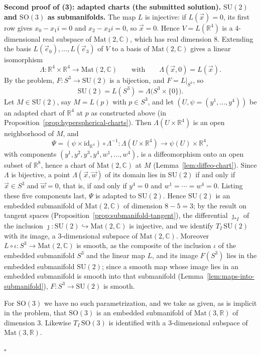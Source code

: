 \documentclass[11pt]{report}
\renewenvironment{proof}[1][Proof]{\noindent\textbf{#1.} }{\hfill$\square$\par\vspace{5pt}}
\begin{document}
\begin{proof}[Second proof of (3): adapted charts (the submitted solution)]
\textbf{$\mathrm{SU}(2)$ and $\mathrm{SO}(3)$ as submanifolds.} The map $L$ is injective: if $L(\vec x) = 0$, its first row gives $x_0 - x_1 i = 0$ and $x_2 - x_3 i = 0$, so $\vec x = 0$. Hence $V = L(\mathbb{R}^4)$ is a $4$-dimensional real subspace of $\mathrm{Mat}(2, \mathbb{C})$, which has real dimension $8$. Extending the basis $L(\vec e_0), \ldots, L(\vec e_3)$ of $V$ to a basis of $\mathrm{Mat}(2, \mathbb{C})$ gives a linear isomorphism
\[
\Lambda : \mathbb{R}^4 \times \mathbb{R}^4 \to \mathrm{Mat}(2, \mathbb{C}) \qquad \text{with} \qquad \Lambda(\vec x, 0) = L(\vec x).
\]
By the problem, $F : S^3 \to \mathrm{SU}(2)$ is a bijection, and $F = L|_{S^3}$, so
\[
\mathrm{SU}(2) = L(S^3) = \Lambda\bigl( S^3 \times \{0\} \bigr).
\]
Let $M \in \mathrm{SU}(2)$, say $M = L(p)$ with $p \in S^3$, and let $(U, \psi = (y^1, \ldots, y^4))$ be an adapted chart of $\mathbb{R}^4$ at $p$ as constructed above (in Proposition~\ref{prop:hyperspherical-charts}). Then $\Lambda(U \times \mathbb{R}^4)$ is an open neighborhood of $M$, and
\[
\Psi = (\psi \times \mathrm{id}_{\mathbb{R}^4}) \circ \Lambda^{-1} : \Lambda(U \times \mathbb{R}^4) \to \psi(U) \times \mathbb{R}^4,
\]
with components $(y^1, y^2, y^3, y^4, w^1, \ldots, w^4)$, is a diffeomorphism onto an open subset of $\mathbb{R}^8$, hence a chart of $\mathrm{Mat}(2, \mathbb{C})$ at $M$ (Lemma~\ref{lem:diffeo-chart}). Since $\Lambda$ is bijective, a point $\Lambda(\vec x, \vec w)$ of its domain lies in $\mathrm{SU}(2)$ if and only if $\vec x \in S^3$ and $\vec w = 0$, that is, if and only if $y^4 = 0$ and $w^1 = \cdots = w^4 = 0$. Listing these five components last, $\Psi$ is adapted to $\mathrm{SU}(2)$. Hence $\mathrm{SU}(2)$ is an embedded submanifold of $\mathrm{Mat}(2, \mathbb{C})$ of dimension $8 - 5 = 3$; by the result on tangent spaces (Proposition~\ref{prop:submanifold-tangent}), the differential $\jmath_{*I}$ of the inclusion $\jmath : \mathrm{SU}(2) \hookrightarrow \mathrm{Mat}(2, \mathbb{C})$ is injective, and we identify $T_I\,\mathrm{SU}(2)$ with its image, a $3$-dimensional subspace of $\mathrm{Mat}(2, \mathbb{C})$. Moreover $L \circ \iota : S^3 \to \mathrm{Mat}(2, \mathbb{C})$ is smooth, as the composite of the inclusion $\iota$ of the embedded submanifold $S^3$ and the linear map $L$, and its image $F(S^3)$ lies in the embedded submanifold $\mathrm{SU}(2)$; since a smooth map whose image lies in an embedded submanifold is smooth into that submanifold (Lemma~\ref{lem:maps-into-submanifold}), $F : S^3 \to \mathrm{SU}(2)$ is smooth.

For $\mathrm{SO}(3)$ we have no such parametrization, and we take as given, as is implicit in the problem, that $\mathrm{SO}(3)$ is an embedded submanifold of $\mathrm{Mat}(3, \mathbb{R})$ of dimension $3$. Likewise $T_I\,\mathrm{SO}(3)$ is identified with a $3$-dimensional subspace of $\mathrm{Mat}(3, \mathbb{R})$.


\end{proof}
\end{document}

